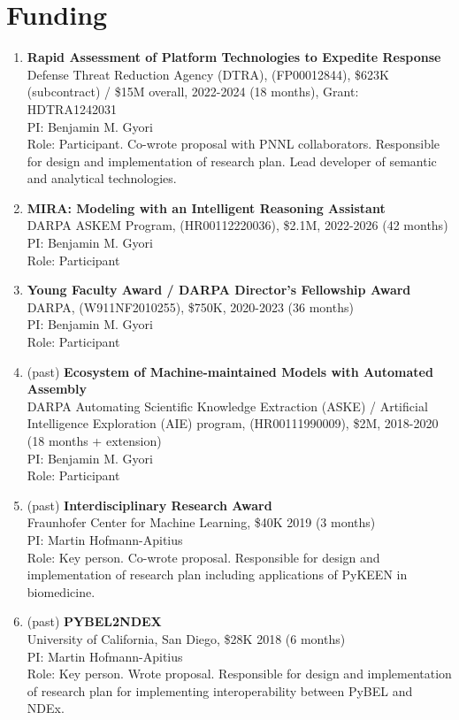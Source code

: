 \documentclass[10pt,a4paper,sans]{moderncv} %
\begin{document}
\section{Funding}
    \begin{enumerate}
    \itemsep0.75em
    \item  \textbf{Rapid Assessment of Platform Technologies to Expedite Response}\\
        Defense Threat Reduction Agency (DTRA), (FP00012844), \$623K (subcontract) / \$15M overall, 2022-2024 (18 months), Grant: HDTRA1242031\\
        PI: Benjamin M. Gyori\\
        Role: Participant. Co-wrote proposal with PNNL collaborators. Responsible for design and implementation of research plan. Lead developer of semantic and analytical technologies.
    \item  \textbf{MIRA: Modeling with an Intelligent Reasoning Assistant}\\
        DARPA ASKEM Program, (HR00112220036), \$2.1M, 2022-2026 (42 months)\\
        PI: Benjamin M. Gyori\\
        Role: Participant
    \item  \textbf{Young Faculty Award / DARPA Director’s Fellowship Award}\\
        DARPA, (W911NF2010255), \$750K, 2020-2023 (36 months)\\
        PI: Benjamin M. Gyori\\
        Role: Participant
    \item (past) \textbf{Ecosystem of Machine-maintained Models with Automated Assembly}\\
        DARPA Automating Scientific Knowledge Extraction (ASKE) / Artificial Intelligence Exploration (AIE) program, (HR00111990009), \$2M, 2018-2020 (18 months + extension)\\
        PI: Benjamin M. Gyori\\
        Role: Participant
    \item (past) \textbf{Interdisciplinary Research Award}\\
        Fraunhofer Center for Machine Learning, \$40K 2019 (3 months)\\
        PI: Martin Hofmann-Apitius\\
        Role: Key person. Co-wrote proposal. Responsible for design and implementation of research plan including applications of PyKEEN in biomedicine.
    \item (past) \textbf{PYBEL2NDEX}\\
        University of California, San Diego, \$28K 2018 (6 months)\\
        PI: Martin Hofmann-Apitius\\
        Role: Key person. Wrote proposal. Responsible for design and implementation of research plan for implementing interoperability between PyBEL and NDEx.
    \end{enumerate}
\end{document}
